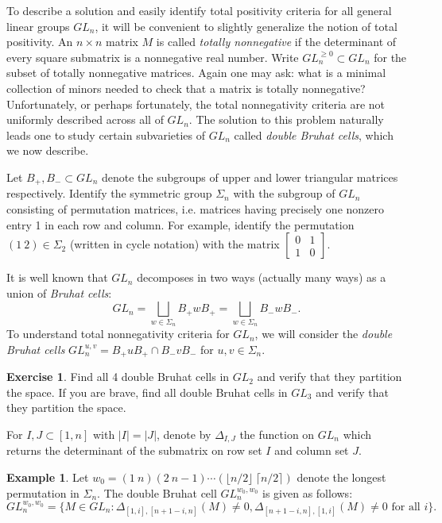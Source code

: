 \documentclass{amsart}
\theoremstyle{definition}
\newtheorem{example}[theorem]{Example}
\newtheorem{exercise}[theorem]{Exercise}
\theoremstyle{remark}
\numberwithin{equation}{section}
\begin{document}
    To describe a solution and easily identify total positivity criteria for all general linear groups $GL_n$, it will be convenient to slightly generalize the notion of total positivity.  An $n\times n$ matrix $M$ is called \emph{totally nonnegative} if the determinant of every square submatrix is a nonnegative real number.  Write $GL_n^{\ge0}\subset GL_n$ for the subset of totally nonnegative matrices.  Again one may ask: what is a minimal collection of minors needed to check that a matrix is totally nonnegative?  Unfortunately, or perhaps fortunately, the total nonnegativity criteria are not uniformly described across all of $GL_n$.  The solution to this problem naturally leads one to study certain subvarieties of $GL_n$ called \emph{double Bruhat cells}, which we now describe.

    Let $B_+,B_-\subset GL_n$ denote the subgroups of upper and lower triangular matrices respectively.  Identify the symmetric group $\Sigma_n$ with the subgroup of $GL_n$ consisting of permutation matrices, i.e. matrices having precisely one nonzero entry 1 in each row and column.  For example, identify the permutation $(1\ 2)\in\Sigma_2$ (written in cycle notation) with the matrix $\left[\begin{array}{cc}0 & 1\\ 1 & 0\end{array}\right]$.  

    It is well known that $GL_n$ decomposes in two ways (actually many ways) as a union of \emph{Bruhat cells}:
    \[GL_n=\bigsqcup_{w\in\Sigma_n}B_+w B_+=\bigsqcup_{w\in\Sigma_n}B_-w B_-.\]
    To understand total nonnegativity criteria for $GL_n$, we will consider the \emph{double Bruhat cells} $GL_n^{u,v}=B_+uB_+\cap B_-vB_-$ for $u,v\in\Sigma_n$.  
    \setcounter{subexercise}{2}
    \begin{exercise}
      Find all 4 double Bruhat cells in $GL_2$ and verify that they partition the space.  If you are brave, find all double Bruhat cells in $GL_3$ and verify that they partition the space.
    \end{exercise}
    For $I,J\subset[1,n]$ with $|I|=|J|$, denote by $\Delta_{I,J}$ the function on $GL_n$ which returns the determinant of the submatrix on row set $I$ and column set $J$.
    \setcounter{subexample}{1}
    \begin{example}\label{example:big cell}
      Let $w_0=(1\ n)(2\ n-1)\cdots(\lfloor n/2\rfloor\ \lceil n/2\rceil)$ denote the longest permutation in $\Sigma_n$.  The double Bruhat cell $GL_n^{w_0,w_0}$ is given as follows:
      \[GL_n^{w_0,w_0}=\{M\in GL_n:\Delta_{[1,i],[n+1-i,n]}(M)\ne0,\Delta_{[n+1-i,n],[1,i]}(M)\ne0\text{ for all $i$}\}.\]
    \end{example}
\end{document}
